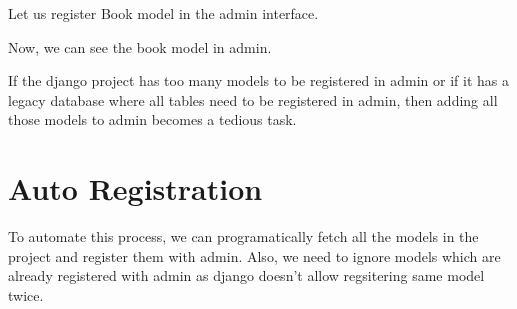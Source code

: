 \documentclass[letterpaper,12pt,english]{sphinxmanual}
\begin{document}
Let us register Book model in the admin interface.

\begin{sphinxVerbatim}[commandchars=\\\{\}]

   

   


 
        


 
\end{sphinxVerbatim}

Now, we can see the book model in admin.


If the django project has too many models to be registered in admin or if it has a legacy database where all tables need to be registered in admin, then adding all those models to admin becomes a tedious task.


\section{Auto Registration}
\label{\detokenize{admin_auto_register_models:auto-registration}}
To automate this process, we can programatically fetch all the models in the project and register them with admin. Also, we need to ignore models which are already registered with admin as django doesn’t allow regsitering same model twice.

\begin{sphinxVerbatim}[commandchars=\\\{\}]
   


  

   
     
\end{sphinxVerbatim}
\end{document}
